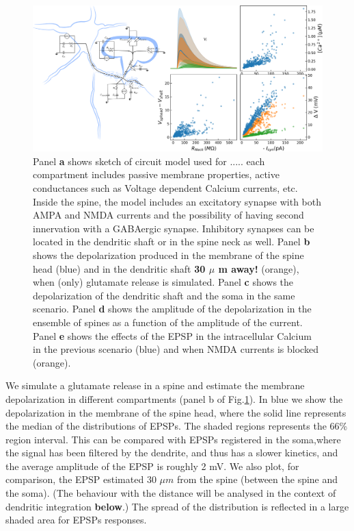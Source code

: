 \documentclass[10pt,letterpaper]{article}
\begin{document}
\begin{figure}[b!]
\includegraphics[width=1.0\linewidth]{Figure_Model_1}
\caption{ Panel {\bf a} shows sketch of circuit model used for ..... each compartment includes passive membrane properties, active conductances such as Voltage dependent Calcium currents, etc. Inside the spine, the model includes an excitatory synapse with both AMPA and NMDA currents and the possibility of having second innervation with a GABAergic synapse. Inhibitory synapses can be located in the dendritic shaft or in the spine neck as well. Panel {\bf  b} shows the depolarization produced in the membrane of the spine head (blue) and in the dendritic shaft {\bf 30 $\mu$ m away!} (orange), when (only) glutamate release is simulated.  Panel {\bf c} shows the depolarization of the dendritic shaft and the soma in the same scenario. Panel {\bf d} shows the amplitude of the depolarization in the ensemble of spines as a function of the amplitude of the current. Panel {\bf e} shows the effects of the EPSP in the intracellular Calcium in the previous scenario (blue) and when NMDA currents is blocked (orange). \label{fig: base model }}
\end{figure}

We simulate a glutamate release in a spine and estimate the membrane depolarization in different compartments (panel b of Fig.\ref{fig: base model }). In blue we show the depolarization in the membrane of the spine head, where the solid line represents the median of the distributions of EPSPs. The shaded regions represents the 66\% region interval. This can be compared with EPSPs registered in the soma,where the signal has been filtered by the dendrite, and thus has a slower kinetics, and the average amplitude of the EPSP is roughly 2 mV. We also plot, for comparison, the EPSP estimated 30 $\mu m$ from the spine (between the spine and the soma). (The behaviour with the distance will be analysed in the context of dendritic integration {\bf below}.) The spread of the distribution is reflected in a large shaded area for EPSPs responses.
\end{document}
